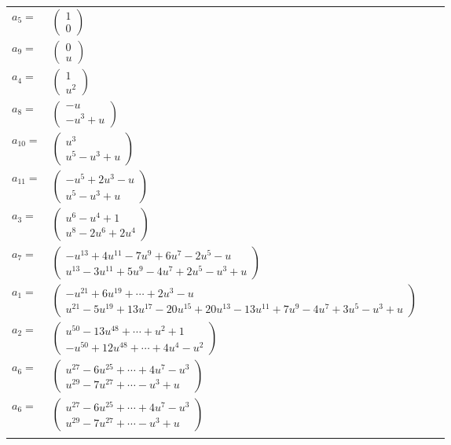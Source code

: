 \documentclass[1p]{elsarticle_modified}
\theoremstyle{definition}
\begin{document}
\begin{tabular}{m{7pt} m{180pt} m{7pt} m{180pt} }
\flushright $a_{5}=$&$\begin{pmatrix}1\\0\end{pmatrix}$ \\
\flushright $a_{9}=$&$\begin{pmatrix}0\\u\end{pmatrix}$ \\
\flushright $a_{4}=$&$\begin{pmatrix}1\\u^2\end{pmatrix}$ \\
\flushright $a_{8}=$&$\begin{pmatrix}- u\\- u^3+u\end{pmatrix}$ \\
\flushright $a_{10}=$&$\begin{pmatrix}u^3\\u^5- u^3+u\end{pmatrix}$ \\
\flushright $a_{11}=$&$\begin{pmatrix}- u^5+2 u^3- u\\u^5- u^3+u\end{pmatrix}$ \\
\flushright $a_{3}=$&$\begin{pmatrix}u^6- u^4+1\\u^8-2 u^6+2 u^4\end{pmatrix}$ \\
\flushright $a_{7}=$&$\begin{pmatrix}- u^{13}+4 u^{11}-7 u^9+6 u^7-2 u^5- u\\u^{13}-3 u^{11}+5 u^9-4 u^7+2 u^5- u^3+u\end{pmatrix}$ \\
\flushright $a_{1}=$&$\begin{pmatrix}- u^{21}+6 u^{19}+\cdots+2 u^3- u\\u^{21}-5 u^{19}+13 u^{17}-20 u^{15}+20 u^{13}-13 u^{11}+7 u^9-4 u^7+3 u^5- u^3+u\end{pmatrix}$ \\
\flushright $a_{2}=$&$\begin{pmatrix}u^{50}-13 u^{48}+\cdots+u^2+1\\- u^{50}+12 u^{48}+\cdots+4 u^4- u^2\end{pmatrix}$ \\
\flushright $a_{6}=$&$\begin{pmatrix}u^{27}-6 u^{25}+\cdots+4 u^7- u^3\\u^{29}-7 u^{27}+\cdots- u^3+u\end{pmatrix}$\\ \flushright $a_{6}=$&$\begin{pmatrix}u^{27}-6 u^{25}+\cdots+4 u^7- u^3\\u^{29}-7 u^{27}+\cdots- u^3+u\end{pmatrix}$\\&\end{tabular}
\end{document}
